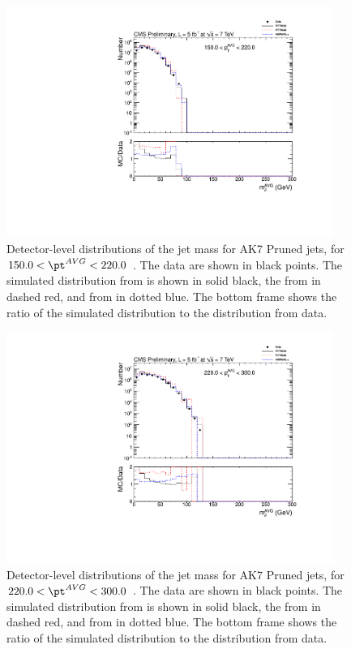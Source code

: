 \ifnpas

\begin{figure}[htbp]
\centering
\includegraphics[width=0.95\textwidth]{figs/histAK7MjetVsPtAvg_rawDataMCComparisons_pt_3_Pruned}
\caption{Detector-level distributions of the jet mass for AK7 Pruned jets,
for $150.0 < \pt^{AVG} < 220.0$ \GeVc. The data are shown in black points.
The simulated distribution from \PYTHIA is shown in solid black, 
the from \PYTHIAEIGHT in dashed red, and from \HERWIG in dotted blue. 
The bottom frame shows the ratio of the simulated distribution
to the distribution from data. 
\label{figs:histAK7MjetVsPtAvg_rawDataMCComparisons_pt_3_Pruned}}
\end{figure}



\begin{figure}[htbp]
\centering
\includegraphics[width=0.95\textwidth]{figs/histAK7MjetVsPtAvg_rawDataMCComparisons_pt_4_Pruned}
\caption{Detector-level distributions of the jet mass for AK7 Pruned jets,
for $220.0 < \pt^{AVG} < 300.0$ \GeVc. The data are shown in black points.
The simulated distribution from \PYTHIA is shown in solid black, 
the from \PYTHIAEIGHT in dashed red, and from \HERWIG in dotted blue. 
The bottom frame shows the ratio of the simulated distribution
to the distribution from data. 
\label{figs:histAK7MjetVsPtAvg_rawDataMCComparisons_pt_4_Pruned}}
\end{figure}



